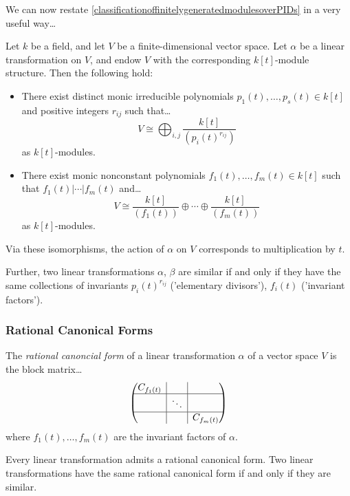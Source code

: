 \noindent We can now restate \ref{classificationoffinitelygeneratedmodulesoverPIDs} in a very useful way\dots

\begin{theorem}
\label{classificationoflineartransformationsoveravectorspace}
Let $k$ be a field, and let $V$ be a finite-dimensional vector space. Let
$\alpha$ be a linear transformation on $V$, and endow $V$ with the corresponding $k[t]$-module structure.
Then the following hold:
\begin{itemize}
  \item There exist distinct monic irreducible polynomials $p_1(t), \dots, p_s(t) \in k[t]$ and positive integers
  $r_{ij}$ such that\dots
  $$V \cong \bigoplus_{i,j}\frac{k[t]}{(p_i(t)^{r_{ij}})}$$
  as $k[t]$-modules.
  \item There exist monic nonconstant polynomials $f_1(t), \dots, f_m(t) \in k[t]$ such that $f_1(t) | \cdots | f_m(t)$
  and\dots
  $$V \cong \frac{k[t]}{(f_1(t))} \oplus \cdots \oplus \frac{k[t]}{(f_m(t))}$$
  as $k[t]$-modules.
\end{itemize}
Via these isomorphisms, the action of $\alpha$ on $V$ corresponds to multiplication by $t$.

Further, two linear transformations $\alpha$, $\beta$ are similar if and only if they have the same collections of
invariants $p_i(t)^{r_{ij}}$ ('elementary divisors'), $f_i(t)$ ('invariant factors').
\end{theorem}

\subsubsection{Rational Canonical Forms}\label{rationalcanoncialforms}
The \emph{rational canoncial form} of a linear transformation $\alpha$ of a vector space $V$ is the block matrix\dots
\[
\begin{pmatrix}
C_{f_1(t)} & \rvline &        & \rvline & \\ \hline
		   & \rvline & \ddots & \rvline & \\ \hline
	       & \rvline & & \rvline & C_{f_m(t)}
\end{pmatrix}
\]
where $f_1(t),\dots, f_m(t)$ are the invariant factors of $\alpha$.

\begin{corollary}
Every linear transformation admits a rational canonical form. Two linear transformations have the same rational
canonical form if and only if they are similar.
\end{corollary}

